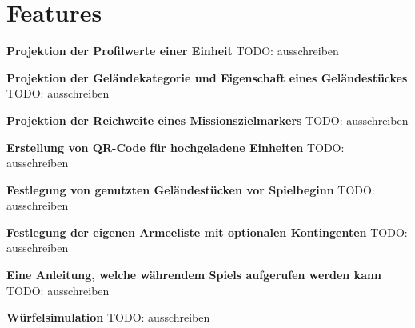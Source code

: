 \section{Features}

\textbf{Projektion der Profilwerte einer Einheit}\newline
TODO: ausschreiben \newline

\textbf{Projektion der Geländekategorie und Eigenschaft eines Geländestückes}\newline
TODO: ausschreiben \newline

\textbf{Projektion der Reichweite eines Missionszielmarkers}\newline
TODO: ausschreiben \newline

\textbf{Erstellung von QR-Code für hochgeladene Einheiten}\newline
TODO: ausschreiben \newline

\textbf{Festlegung von genutzten Geländestücken vor Spielbeginn}\newline
TODO: ausschreiben \newline

\textbf{Festlegung der eigenen Armeeliste mit optionalen Kontingenten}\newline
TODO: ausschreiben \newline

\textbf{Eine Anleitung, welche währendem Spiels aufgerufen werden kann}\newline
TODO: ausschreiben \newline

\textbf{Würfelsimulation}\newline
TODO: ausschreiben